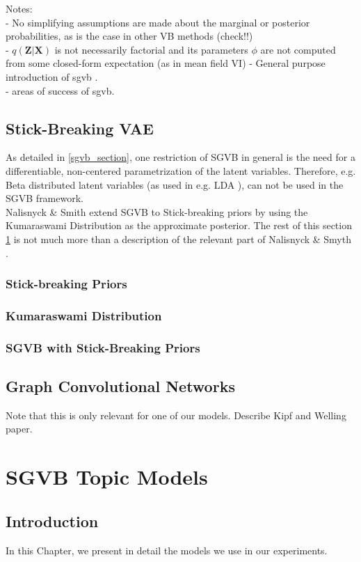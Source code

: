 \documentclass{report}
\begin{document}
Notes:\\
- No simplifying assumptions are made about the marginal or posterior probabilities, as is the case in other VB methods (check!!) \\
- $q(\mathbf{Z}|\mathbf{X})$ is not necessarily factorial and its parameters $\phi$ are not computed from some closed-form expectation (as in mean field VI)
- General purpose introduction of sgvb . \\

- areas of success of sgvb.

\section{Stick-Breaking VAE}\label{sbvae_section}
	As detailed in \ref{sgvb_section}, one restriction of SGVB in general is the need for a differentiable, non-centered parametrization of the latent variables. Therefore, e.g. Beta distributed latent variables (as used in e.g. LDA \cite{bleil2003latent}), can not be used in the SGVB framework. \\ Nalisnyck \& Smith extend SGVB to Stick-breaking priors by using the Kumaraswami Distribution as the approximate posterior. The rest of this section \ref{sbvae_section} is not much more than a description of the relevant part of Nalisnyck \& Smyth \cite{nalisnick2016deep}.
\subsection{Stick-breaking Priors}
\subsection{Kumaraswami Distribution} 
\subsection{SGVB with Stick-Breaking Priors}

\section{Graph Convolutional Networks}\label{GCN_section}
Note that this is only relevant for one of our models. Describe Kipf and Welling paper.
\chapter{SGVB Topic Models}
\section{Introduction}
In this Chapter, we present in detail the models we use in our experiments. 
\end{document}
